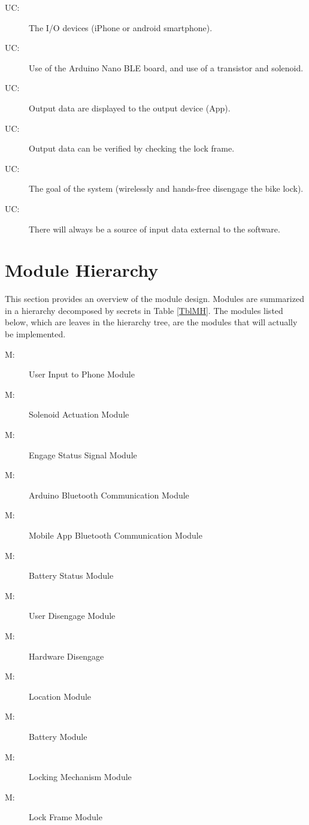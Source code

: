 \documentclass[12pt, titlepage]{article}
\newcounter{ucnum}
\newcommand{\uctheucnum}{UC\theucnum}
\newcounter{mnum}
\newcommand{\mthemnum}{M\themnum}
\begin{document}
\begin{description}

\item[\uctheucnum\label{ucIO}:] The I/O devices (iPhone or android smartphone). 
\item[\uctheucnum\label{ucCircuit}:] Use of the Arduino Nano BLE board, and use of a transistor and solenoid.
\item[\uctheucnum\label{ucOutput}:] Output data are displayed to the output device (App). 
\item[\uctheucnum\label{ucVerify}:] Output data can be verified by checking the lock frame. 
\item[\uctheucnum\label{ucGoal}:] The goal of the system (wirelessly and hands-free disengage the bike lock). 
\item[\uctheucnum\label{ucInput}:] There will always be a source of input data external to the software.

\end{description}

\section{Module Hierarchy} \label{SecMH}

This section provides an overview of the module design. Modules are summarized
in a hierarchy decomposed by secrets in Table \ref{TblMH}. The modules listed
below, which are leaves in the hierarchy tree, are the modules that will
actually be implemented.

\begin{description}
\item [ \mthemnum \label{mUIP}:] User Input to Phone Module
\item [ \mthemnum \label{mSA}:] Solenoid Actuation Module
\item [ \mthemnum \label{mESS}:] Engage Status Signal Module 
\item [ \mthemnum \label{mABC}:] Arduino Bluetooth Communication Module
\item [ \mthemnum \label{mMABC}:] Mobile App Bluetooth Communication Module
\item [ \mthemnum \label{mBS}:] Battery Status Module 
\item [ \mthemnum \label{mUD}:] User Disengage Module
\item [ \mthemnum \label{mHD}:] Hardware Disengage
\item [ \mthemnum \label{mL}:] Location Module 
\item [ \mthemnum \label{mB}:] Battery Module 
\item [ \mthemnum \label{mLM}:] Locking Mechanism Module 
\item [ \mthemnum \label{mLF}:] Lock Frame Module 

\end{description}
\end{document}

